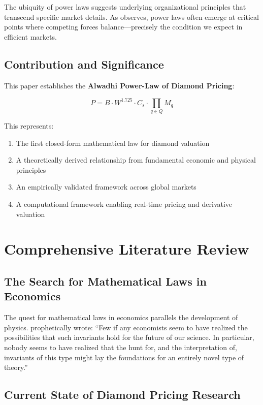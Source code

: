 \documentclass[12pt,a4paper]{article}
\theoremstyle{definition}
\theoremstyle{remark}
\begin{document}
The ubiquity of power laws suggests underlying organizational principles that transcend specific market details. As \citet{bouchaud2000theory} observes, power laws often emerge at critical points where competing forces balance—precisely the condition we expect in efficient markets.

\subsection{Contribution and Significance}

This paper establishes the \textbf{Alwadhi Power-Law of Diamond Pricing}:

\begin{equation}
\boxed{P = B \cdot W^{1.725} \cdot C_s \cdot \prod_{q \in Q} M_q}
\label{eq:alwadhi_law}
\end{equation}

This represents:
\begin{enumerate}
\item The first closed-form mathematical law for diamond valuation
\item A theoretically derived relationship from fundamental economic and physical principles
\item An empirically validated framework across global markets
\item A computational framework enabling real-time pricing and derivative valuation
\end{enumerate}

\section{Comprehensive Literature Review}

\subsection{The Search for Mathematical Laws in Economics}

The quest for mathematical laws in economics parallels the development of physics. \citet{schumpeter1949} prophetically wrote: ``Few if any economists seem to have realized the possibilities that such invariants hold for the future of our science. In particular, nobody seems to have realized that the hunt for, and the interpretation of, invariants of this type might lay the foundations for an entirely novel type of theory.''

\subsection{Current State of Diamond Pricing Research}
\end{document}
